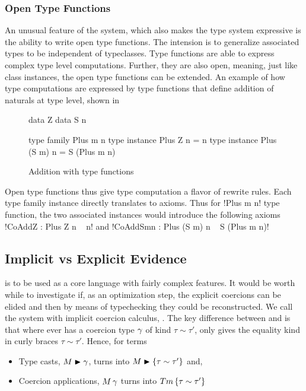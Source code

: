 \documentclass[manuscript,screen,nonacm]{acmart}
\begin{document}
\subsubsection{Open Type Functions}
An unusual feature of the system, which also makes the type system expressive is the ability to write open type functions. The intension is to generalize associated types to be independent of typeclasses. Type functions are able to express complex type level computations. Further, they are also open, meaning, just like class instances, the open type functions can be extended. An example of how type computations are expressed by type functions that define addition of naturals at type level, shown in 
\begin{figure}[ht]
  \begin{minipage}[ht]{0.4\linewidth}
    \begin{code}
      data Z
      data S n
    \end{code}
  \end{minipage}%
  \begin{minipage}[ht]{0.4\linewidth}
    \begin{code}
      type family Plus m n
      type instance Plus Z n = n
      type instance Plus (S m) n = S (Plus m n)
    \end{code}
  \end{minipage}
  \caption{Addition with type functions}
  \label{fig:open-type-fun-add}
\end{figure}
Open type functions thus give type computation a flavor of rewrite rules.
Each type family instance directly translates to axioms. Thus for !Plus m n! type function, the two associated instances would introduce the following axioms !CoAddZ : Plus Z n ~ n! and !CoAddSmn : Plus (S m) n ~ S (Plus m n)!

\subsection{Implicit vs Explicit Evidence}
\SFC is to be used as a core language with fairly complex features. It would be worth while to investigate if, as an optimization step, the explicit coercions can be elided and then by means of typechecking they could be reconstructed. We call the system with implicit coercion calculus, \SFCi. The key difference between \SFC and \SFCi is that where ever \SFC has a coercion type $\gamma$ of kind $\tau\sim\tau'$, \SFCi only gives the equality kind in curly braces $\tau\sim\tau'$. Hence, for terms
\begin{itemize}
\item Type casts, $M\mathrel{\blacktriangleright}\gamma$, turns into $M\mathrel{\blacktriangleright}\{\tau \sim \tau'\}$ and,
\item Coercion applications, $M\,\gamma$ turns into $Tm\,\{\tau \sim \tau'\}$
\end{itemize}
\end{document}

